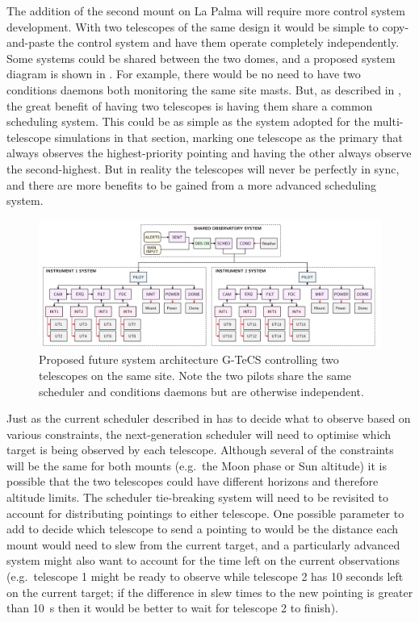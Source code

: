 \begin{colsection}
\begin{colsection}
The addition of the second mount on La Palma will require more control system development. With two telescopes of the same design it would be simple to copy-and-paste the control system and have them operate completely independently. Some systems could be shared between the two domes, and a proposed system diagram is shown in .  For example, there would be no need to have two conditions daemons both monitoring the same site masts. But, as described in
,
the great benefit of having two telescopes is having them share a common scheduling system. This could be as simple as the system adopted for the multi-telescope simulations in that section, marking one telescope as the primary that always observes the highest-priority pointing and having the other always observe the second-highest. But in reality the telescopes will never be perfectly in sync, and there are more benefits to be gained from a more advanced scheduling system.

\begin{figure}[t]
    \begin{center}
        \includegraphics[width=\linewidth]{images/flow2.pdf}
    \end{center}
    \caption[Future G-TeCS system architecture for two telescopes]{
        Proposed future system architecture G-TeCS controlling two telescopes on the same site. Note the two pilots share the same scheduler and conditions daemons but are otherwise independent.
    }\label{fig:flow2}
\end{figure}

Just as the current scheduler described in
has to decide what to observe based on various constraints, the next-generation scheduler will need to optimise which target is being observed by each telescope. Although several of the constraints will be the same for both mounts (e.g.\ the Moon phase or Sun altitude) it is possible that the two telescopes could have different horizons and therefore altitude limits. The scheduler tie-breaking system will need to be revisited to account for distributing pointings to either telescope. One possible parameter to add to decide which telescope to send a pointing to would be the distance each mount would need to slew from the current target, and a particularly advanced system might also want to account for the time left on the current observations (e.g.\ telescope 1 might be ready to observe while telescope 2 has 10 seconds left on the current target; if the difference in slew times to the new pointing is greater than \SI{10}{\second} then it would be better to wait for telescope 2 to finish).


\end{colsection}
\end{colsection}
